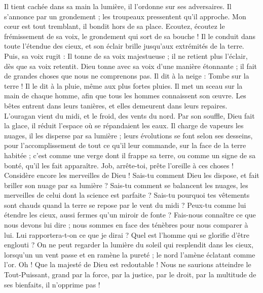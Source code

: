 \begin{multicols}{2}
Il tient cachée dans sa main la lumière, il l'ordonne sur ses adversaires.
Il s'annonce par un grondement ; les troupeaux pressentent qu'il approche.
\VerseOne{}Mon cœur est tout tremblant, il bondit hors de sa place.
Ecoutez, écoutez le frémissement de sa voix, le grondement qui sort de sa bouche !
Il le conduit dans toute l'étendue des cieux, et son éclair brille jusqu'aux extrémités de la terre.
Puis, sa voix rugit : Il tonne de sa voix majestueuse ; il ne retient plus l'éclair, dès que sa voix retentit.
Dieu tonne avec sa voix d'une manière étonnante ; il fait de grandes choses que nous ne comprenons pas.
Il dit à la neige : Tombe sur la terre ! Il le dit à la pluie, même aux plus fortes pluies.
Il met un sceau sur la main de chaque homme, afin que tous les hommes connaissent son œuvre.
Les bêtes entrent dans leurs tanières, et elles demeurent dans leurs repaires.
L'ouragan vient du midi, et le froid, des vents du nord.
Par son souffle, Dieu fait la glace, il réduit l'espace où se répandaient les eaux.
Il charge de vapeurs les nuages, il les disperse par sa lumière ;
leurs évolutions se font selon ses desseins, pour l'accomplissement de tout ce qu'il leur commande, sur la face de la terre habitée ;
c'est comme une verge dont il frappe sa terre, ou comme un signe de sa bonté, qu'il les fait apparaître.
Job, arrête-toi, prête l'oreille à ces choses ! Considère encore les merveilles de Dieu !
Sais-tu comment Dieu les dispose, et fait briller son nuage par sa lumière ?
Sais-tu comment se balancent les nuages, les merveilles de celui dont la science est parfaite ?
Sais-tu pourquoi tes vêtements sont chauds quand la terre se repose par le vent du midi ?
Peux-tu comme lui étendre les cieux, aussi fermes qu'un miroir de fonte ?
Fais-nous connaître ce que nous devons lui dire ; nous sommes en face des ténèbres pour nous comparer à lui.
Lui rapportera-t-on ce que je dirai ? Quel est l'homme qui se glorifie d'être englouti ?
On ne peut regarder la lumière du soleil qui resplendit dans les cieux, lorsqu'un un vent passe et en ramène la pureté ;
le nord l'amène éclatant comme l'or. Oh ! Que la majesté de Dieu est redoutable !
Nous ne saurions atteindre le Tout-Puissant, grand par la force, par la justice, par le droit, par la multitude de ses bienfaits, il n'opprime pas !

\end{multicols}
